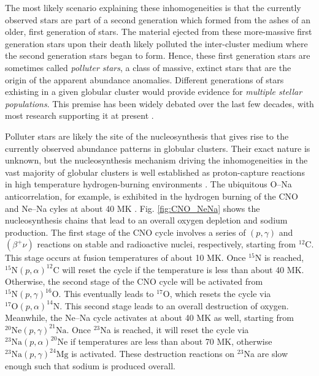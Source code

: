 The most likely scenario explaining these inhomogeneities is that the currently observed stars are part of a second generation which formed from the ashes of an older, first generation of stars. The material ejected from these more-massive first generation stars upon their death likely polluted the inter-cluster medium where the second generation stars began to form. Hence, these first generation stars are sometimes called \emph{polluter stars}, a class of massive, extinct stars that are the origin of the apparent abundance anomalies. Different generations of stars exhisting in a given globular cluster would provide evidence for \emph{multiple stellar populations}. This premise has been widely debated over the last few decades, with most research supporting it at present \cite{Gratton2004,Gratton2012,Gratton2019}.


Polluter stars are likely the site of the nucleosynthesis that gives rise to the currently observed abundance patterns in globular clusters. Their exact nature is unknown, but the nucleosynthesis mechanism driving the inhomogeneities in the vast majority of globular clusters is well established as proton-capture reactions in high temperature hydrogen-burning environments \cite{Denisenkov1989,Langer1993}. The ubiquitous O--Na anticorrelation, for example, is exhibited in the hydrogen burning of the CNO and Ne--Na cyles at about 40 MK \cite{Gratton2019}. Fig. \ref{fig:CNO_NeNa} shows the nucleosynthesis chains that lead to an overall oxygen depletion and sodium production. The first stage of the CNO cycle involves a series of $(p, \gamma)$ and $(\beta^{+}\nu)$ reactions on stable and radioactive nuclei, respectively, starting from $^{12}$C. This stage occurs at fusion temperatures of about 10 MK. Once $^{15}$N is reached, $^{15}\mathrm{N}(p, \alpha)^{12}\mathrm{C}$ will reset the cycle if the temperature is less than about 40 MK. Otherwise, the second stage of the CNO cycle will be activated from $^{15}\mathrm{N}(p, \gamma)^{16}\mathrm{O}$. This eventually leads to $^{17}$O, which resets the cycle via $^{17}\mathrm{O}(p, \alpha)^{14}\mathrm{N}$. This second stage leads to an overall destruction of oxygen. Meanwhile, the Ne--Na cycle activates at about 40 MK as well, starting from $^{20}\mathrm{Ne}(p, \gamma)^{21}\mathrm{Na}$. Once $^{23}$Na is reached, it will reset the cycle via $^{23}\mathrm{Na}(p, \alpha)^{20}\mathrm{Ne}$ if temperatures are less than about 70 MK, otherwise $^{23}\mathrm{Na}(p, \gamma)^{24}\mathrm{Mg}$ is activated. These destruction reactions on $^{23}$Na are slow enough such that sodium is produced overall.

